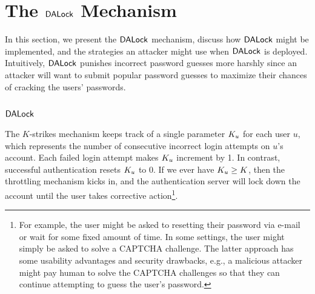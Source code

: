 
\vspace{-0.2cm}
\section{The $\mathsf{DALock}$ Mechanism}\label{sec:DALockAlgorithm} %

In this section, we present the $\mathsf{DALock}$ mechanism, discuss how $\mathsf{DALock}$ might be implemented, and the strategies an attacker might use when $\mathsf{DALock}$ is deployed. Intuitively, $\mathsf{DALock}$ punishes incorrect password guesses more harshly since an attacker will want to submit popular password guesses to maximize their chances of cracking the users' passwords.
	\vspace{-0.3cm}
\subsection{$\mathsf{DALock}$} %
\vspace{-0.2cm}
The $K$-strikes mechanism keeps track of a single parameter $K_u$ for each user $u$, which represents the number of consecutive incorrect login attempts on $u$’s account. Each failed login attempt makes $K_u$ increment by 1. In contrast, successful authentication resets $K_u$ to 0. If we ever have $K_u \geq K$, then the throttling mechanism kicks in, and the authentication server will lock down the account until the user takes corrective action\footnote{For example, the user might be asked to resetting their password via e-mail or wait for some fixed amount of time. In some settings, the user might simply be asked to solve a CAPTCHA challenge. The latter approach has some usability advantages and security drawbacks, e.g., a malicious attacker might pay human to solve the CAPTCHA challenges so that they can continue attempting to guess the user's password.}.

